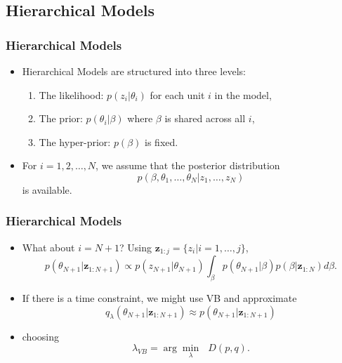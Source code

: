 \documentclass[11pt]{beamer}\usepackage[]{graphicx}\usepackage[]{color}
\begin{document}
\begin{frame}
\subsection{Hierarchical Models}
\frametitle{Hierarchical Models}
\begin{itemize}
\item Hierarchical Models are structured into three levels:
\begin{enumerate}
\item The likelihood: $p(z_i | \theta_i)$ for each unit $i$ in the model,
\item The prior: $p(\theta_i | \beta)$ where $\beta$ is shared across all $i$,
\item The hyper-prior: $p(\beta)$ is fixed.
\end{enumerate}
\vspace{5mm}
\item For $i = 1, 2, \dots, N$, we assume that the posterior distribution $$p(\beta, \theta_1, \dots, \theta_N | z_1, \dots, z_N)$$ is available.
\end{itemize}
\end{frame}

\begin{frame}
\frametitle{Hierarchical Models}
\begin{itemize}
\item What about $i = N+1$? Using $\textbf{z}_{1:j} = \{z_i | i = 1, \dots, j\}$, $$p(\theta_{N+1} |\textbf{z}_{1:N+1}) \propto p(z_{N+1} | \theta_{N+1})\int_{\beta}p(\theta_{N+1} | \beta)p(\beta | \textbf{z}_{1:N})d\beta.$$
\item If there is a time constraint, we might use VB and approximate $$q_{\lambda}(\theta_{N+1} | \textbf{z}_{1:N+1}) \approx p(\theta_{N+1} |\textbf{z}_{1:N+1})$$
\item choosing $$\lambda_{VB} = \arg \underset{\lambda}{\min}\mbox{ }D(p, q).$$
\end{itemize}
\end{frame}
\end{document}
